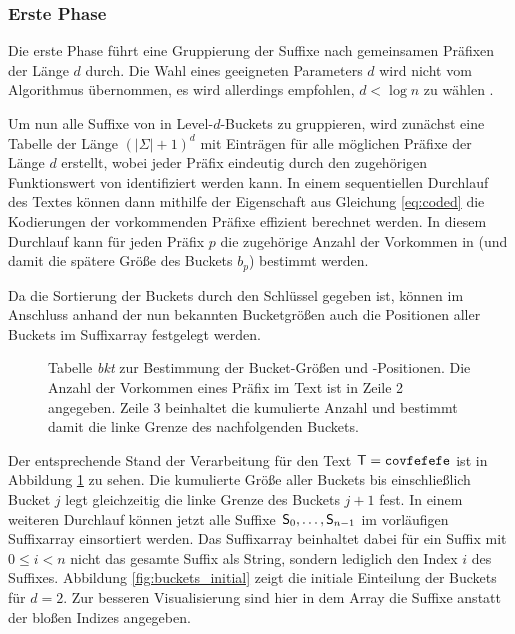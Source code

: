 \subsubsection{Erste Phase}
\label{bpr:algorithmus:phase1}

Die erste Phase führt eine Gruppierung der Suffixe nach gemeinsamen Präfixen der Länge \(d\) durch. Die Wahl eines geeigneten Parameters \(d\) wird nicht vom Algorithmus übernommen, es wird allerdings empfohlen, \(d < \log n\) zu wählen \cite{schuermann2005}.\par
Um nun alle Suffixe von  in Level-\(d\)-Buckets zu gruppieren, wird zunächst eine Tabelle \bkt der Länge \((|\Sigma| + 1)^d\) mit Einträgen für alle möglichen Präfixe der Länge \(d\) erstellt, wobei jeder Präfix eindeutig durch den zugehörigen Funktionswert von \coded identifiziert werden kann. In einem sequentiellen Durchlauf des Textes  können dann mithilfe der Eigenschaft aus Gleichung \ref{eq:coded} die Kodierungen der vorkommenden Präfixe effizient berechnet werden. In diesem Durchlauf kann für jeden Präfix \(p\) die zugehörige Anzahl der Vorkommen in  (und damit die spätere Größe des Buckets \(b_p\)) bestimmt werden.\par
Da die Sortierung der Buckets durch den Schlüssel \coded gegeben ist, können im Anschluss anhand der nun bekannten Bucketgrößen auch die Positionen aller Buckets im Suffixarray festgelegt werden.
\begin{figure}[ht]
	\vspace{0.2\baselineskip}
	\caption[Tabelle \emph{bkt} zur Bestimmung der Bucket-Größen und -Positionen]{Tabelle \emph{bkt} zur Bestimmung der Bucket-Größen und -Positionen. Die Anzahl der Vorkommen eines Präfix im Text ist in Zeile 2 angegeben. Zeile 3 beinhaltet die kumulierte Anzahl und bestimmt damit die linke Grenze des nachfolgenden Buckets.}
	\label{fig:bkt}
\end{figure}
Der entsprechende Stand der Verarbeitung für den Text \(\inputtext = \covfefefe\) ist in Abbildung \ref{fig:bkt} zu sehen. Die kumulierte Größe aller Buckets bis einschließlich Bucket \(j\) legt gleichzeitig die linke Grenze des Buckets \(j+1\) fest. In einem weiteren Durchlauf können jetzt alle Suffixe \(\mathsf{S}_{0}, \ldots, \mathsf{S}_{n-1}\) im vorläufigen Suffixarray \sa einsortiert werden. Das Suffixarray beinhaltet dabei für ein Suffix  mit \(0 \leq i < n\) nicht das gesamte Suffix als String, sondern lediglich den Index \(i\) des Suffixes. Abbildung \ref{fig:buckets_initial} zeigt die initiale Einteilung der Buckets für \(d=2\). Zur besseren Visualisierung sind hier in dem Array die Suffixe anstatt der bloßen Indizes angegeben.\par\smallskip
